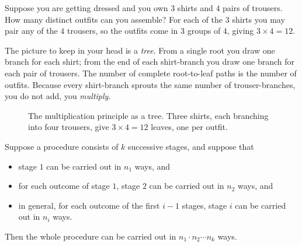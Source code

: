 Suppose you are getting dressed and you own $3$ shirts and $4$ pairs of
trousers. How many distinct outfits can you assemble? For each of the $3$ shirts you may
pair any of the $4$ trousers, so the outfits come in $3$ groups of $4$, giving $3 \times 4 = 12$.

\begin{intuitionbox}
The picture to keep in your head is a \emph{tree}. From a single root you draw one branch
for each shirt; from the end of each shirt-branch you draw one branch for each pair of
trousers. The number of complete root-to-leaf paths is the number of outfits. Because
every shirt-branch sprouts the same number of trouser-branches, you do not add, you
\emph{multiply}.
\end{intuitionbox}

\begin{figure}[H]
\centering
{}
\caption{The multiplication principle as a tree. Three shirts, each branching into four
trousers, give $3 \times 4 = 12$ leaves, one per outfit.}
\label{ch2:fig-tree}
\end{figure}

\begin{theorem}
\label{ch2:thm-mult}
Suppose a procedure consists of $k$ successive stages, and suppose that
\begin{itemize}
  \item stage $1$ can be carried out in $n_1$ ways, and
  \item for each outcome of stage $1$, stage $2$ can be carried out in $n_2$ ways, and
  \item in general, for each outcome of the first $i-1$ stages, stage $i$ can be carried
        out in $n_i$ ways.
\end{itemize}
Then the whole procedure can be carried out in $n_1 \cdot n_2 \cdots n_k$ ways.
\end{theorem}


